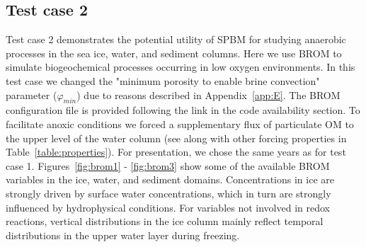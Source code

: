 \documentclass[gmd, manuscript]{copernicus}
\begin{document}
\subsection{Test case 2}
\label{subsec:tc2}

Test case 2 demonstrates the potential utility of \textrm{SPBM} for studying anaerobic processes in the sea ice, water, and sediment columns.
Here we use \textrm{BROM} to simulate biogeochemical processes occurring in low oxygen environments.
In this test case we changed the "minimum porosity to enable brine convection" parameter ($\varphi_{min}$) due to reasons described in Appendix~\ref{app:E}.
The \textrm{BROM} configuration file is provided following the link in the code availability section.
To facilitate anoxic conditions we forced a supplementary flux of particulate \textrm{OM} to the upper level of the water column (see along with other forcing properties in Table~\ref{table:properties}).
For presentation, we chose the same years as for test case 1.
Figures~\ref{fig:brom1} - \ref{fig:brom3} show some of the available \textrm{BROM} variables in the ice, water, and sediment domains.
Concentrations in ice are strongly driven by surface water concentrations, which in turn are strongly influenced by hydrophysical conditions.
For variables not involved in redox reactions, vertical distributions in the ice column mainly reflect temporal distributions in the upper water layer during freezing.
\end{document}

